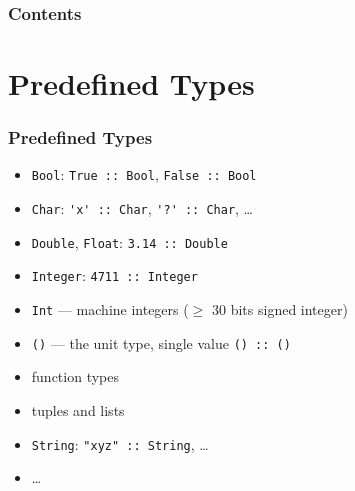 \documentclass{beamer}
\subtitle{Types}
\begin{document}
\begin{frame}
  \titlepage
\end{frame}
\begin{frame}
  \frametitle{Contents}
  \tableofcontents{}
\end{frame}
\section{Predefined Types}
\begin{frame}[fragile]
  \frametitle{Predefined Types}
  \begin{itemize}
  \item \texttt{Bool}: \lstinline{True :: Bool}, \lstinline{False :: Bool}
  \item  \texttt{Char}: \lstinline{'x' :: Char}, \lstinline{'?' :: Char}, \dots
  \item \texttt{Double}, \texttt{Float}: \lstinline{3.14 :: Double}
  \item   \texttt{Integer}: \lstinline{4711 :: Integer}
  \item  \texttt{Int} --- machine integers ($\ge$ 30 bits signed
    integer)
  \item  \texttt{()}
    --- the unit type, single value \lstinline{() :: ()}
  \item  function types
  \item tuples and lists
  \item \texttt{String}:  \lstinline{"xyz" :: String}, \dots
  \item \dots
  \end{itemize}
\end{frame}
\end{document}
